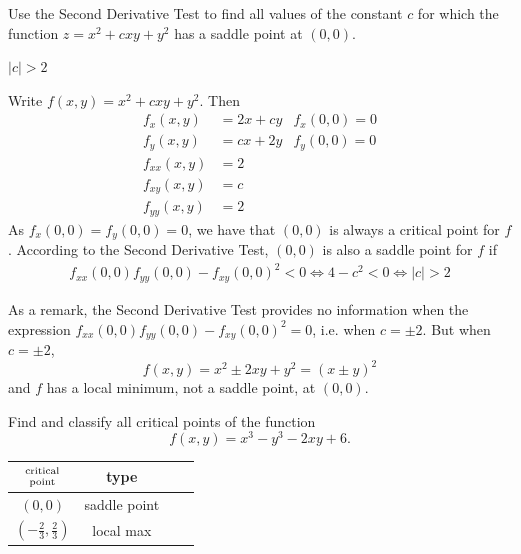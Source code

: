 \begin{question}[M200 2006A] %
Use the Second Derivative Test to find all values of the constant $c$ 
for which the function $z = x^2 + cxy + y^2$ has a saddle point at $(0,0)$.
\end{question}

%

\begin{answer}
$|c|>2$
\end{answer}

\begin{solution}
Write $f(x,y) = x^2 +cxy +y^2$. Then
\begin{align*}
f_x(x,y)&= 2x+cy & f_x(0,0) = 0 \\
f_y(x,y)&= cx+2y & f_y(0,0) = 0 \\
f_{xx}(x,y) &= 2 \\
f_{xy}(x,y) &= c \\
f_{yy}(x,y) &= 2
\end{align*}
As $f_x(0,0)=f_y(0,0)=0$, we have that $(0,0)$ is always a critical point
for $f$. According to the Second Derivative Test, $(0,0)$ is also a saddle point
for $f$ if
\begin{align*}
f_{xx}(0,0) f_{yy}(0,0) - f_{xy}(0,0)^2 <0
\iff 4-c^2 <0
\iff |c|>2
\end{align*}

As a remark, the Second Derivative Test provides no information 
when the expression
$f_{xx}(0,0) f_{yy}(0,0) - f_{xy}(0,0)^2 =0$, i.e. when $c=\pm 2$.
But when $c=\pm 2$,
\begin{equation*}
f(x,y) =  x^2 \pm 2xy + y^2 =(x\pm y)^2
\end{equation*}
and $f$ has a local minimum, not a saddle point, at $(0,0)$.
\end{solution}


\begin{question}[M200 2006D] %

\end{question}
Find and classify all critical points of the function
\begin{equation*}
f(x, y) = x^3 - y^3 - 2xy + 6.
\end{equation*}
%

\begin{answer}
\renewcommand{\arraystretch}{1.3}
     \begin{tabular}{|c|c|c|c|}
     \hline
    $\Atop{\text{critical}}{\text{point}}$ & type \\    
    \hline
     $(0,0)$ & saddle point  \\ \hline
     $\left(-\frac{2}{3},\frac{2}{3}\right)$ & local max \\  \hline
     \end{tabular}
\renewcommand{\arraystretch}{1.0}
\end{answer}

